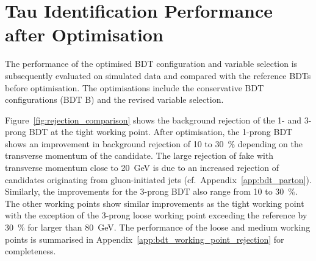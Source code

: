 

\section{Tau Identification Performance after Optimisation}
\label{sec:bdt_perf}
The performance of the optimised BDT configuration and variable selection is
subsequently evaluated on simulated data and compared with the reference BDTs
before optimisation. The optimisations include the conservative BDT
configurations (BDT B) and the revised variable selection.

Figure~\ref{fig:rejection_comparison} shows the background rejection of the 1-
and 3-prong BDT at the tight working point. After optimisation, the 1-prong BDT
shows an improvement in background rejection of \num{10} to \SI{30}{\percent}
depending on the transverse momentum of the \tauhadvis candidate. The large
rejection of fake \tauhadvis with transverse momentum close to \SI{20}{\GeV} is
due to an increased rejection of \tauhadvis candidates originating from
gluon-initiated jets (cf.\ Appendix~\ref{app:bdt_parton}).  Similarly, the improvements for the 3-prong BDT also range from
\num{10} to \SI{30}{\percent}. The other working points show similar
improvements as the tight working point with the exception of the 3-prong loose
working point exceeding the reference by \SI{30}{\percent} for \tauhadvis \pt
larger than \SI{80}{\GeV}. The performance of the loose and medium working
points is summarised in Appendix~\ref{app:bdt_working_point_rejection} for
completeness.

